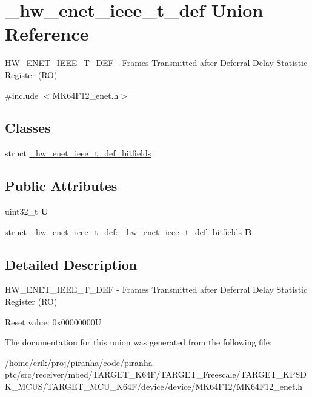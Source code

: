 \hypertarget{union__hw__enet__ieee__t__def}{}\section{\+\_\+hw\+\_\+enet\+\_\+ieee\+\_\+t\+\_\+def Union Reference}
\label{union__hw__enet__ieee__t__def}


H\+W\+\_\+\+E\+N\+E\+T\+\_\+\+I\+E\+E\+E\+\_\+\+T\+\_\+\+D\+EF -\/ Frames Transmitted after Deferral Delay Statistic Register (RO)  




{\ttfamily \#include $<$M\+K64\+F12\+\_\+enet.\+h$>$}

\subsection*{Classes}
\begin{DoxyCompactItemize}
\item 
struct \hyperlink{struct__hw__enet__ieee__t__def_1_1__hw__enet__ieee__t__def__bitfields}{\+\_\+hw\+\_\+enet\+\_\+ieee\+\_\+t\+\_\+def\+\_\+bitfields}
\end{DoxyCompactItemize}
\subsection*{Public Attributes}
\begin{DoxyCompactItemize}
\item 
uint32\+\_\+t {\bfseries U}\hypertarget{union__hw__enet__ieee__t__def_a9f5469b10199f16bf6ca543066fa5211}{}\label{union__hw__enet__ieee__t__def_a9f5469b10199f16bf6ca543066fa5211}

\item 
struct \hyperlink{struct__hw__enet__ieee__t__def_1_1__hw__enet__ieee__t__def__bitfields}{\+\_\+hw\+\_\+enet\+\_\+ieee\+\_\+t\+\_\+def\+::\+\_\+hw\+\_\+enet\+\_\+ieee\+\_\+t\+\_\+def\+\_\+bitfields} {\bfseries B}\hypertarget{union__hw__enet__ieee__t__def_a9a777a5e2684edb1363b9e27dfba33c0}{}\label{union__hw__enet__ieee__t__def_a9a777a5e2684edb1363b9e27dfba33c0}

\end{DoxyCompactItemize}


\subsection{Detailed Description}
H\+W\+\_\+\+E\+N\+E\+T\+\_\+\+I\+E\+E\+E\+\_\+\+T\+\_\+\+D\+EF -\/ Frames Transmitted after Deferral Delay Statistic Register (RO) 

Reset value\+: 0x00000000U 

The documentation for this union was generated from the following file\+:\begin{DoxyCompactItemize}
\item 
/home/erik/proj/piranha/code/piranha-\/ptc/src/receiver/mbed/\+T\+A\+R\+G\+E\+T\+\_\+\+K64\+F/\+T\+A\+R\+G\+E\+T\+\_\+\+Freescale/\+T\+A\+R\+G\+E\+T\+\_\+\+K\+P\+S\+D\+K\+\_\+\+M\+C\+U\+S/\+T\+A\+R\+G\+E\+T\+\_\+\+M\+C\+U\+\_\+\+K64\+F/device/device/\+M\+K64\+F12/M\+K64\+F12\+\_\+enet.\+h\end{DoxyCompactItemize}
